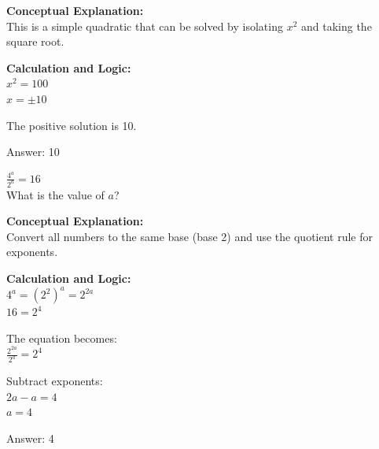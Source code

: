 \documentclass[11pt,paper=a4,answers]{exam}
\begin{document}
\begin{questions}
\begin{solution}
\textbf{Conceptual Explanation:} \\
This is a simple quadratic that can be solved by isolating $x^2$ and taking the square root.

\vspace{20pt}

\textbf{Calculation and Logic:} \\
$x^2 = 100$ \\
$x = \pm 10$

\vspace{10pt}

The positive solution is 10.

\vspace{25pt}

Answer: \colorbox{yellow!100}{10}
\end{solution}

\vspace{40pt}

\question
$\frac{4^a}{2^a} = 16$ \\
What is the value of $a$?

\begin{solution}
\textbf{Conceptual Explanation:} \\
Convert all numbers to the same base (base 2) and use the quotient rule for exponents.

\vspace{20pt}

\textbf{Calculation and Logic:} \\
$4^a = (2^2)^a = 2^{2a}$ \\
$16 = 2^4$

\vspace{10pt}

The equation becomes: \\
$\frac{2^{2a}}{2^a} = 2^4$

\vspace{10pt}

Subtract exponents: \\
$2a - a = 4$ \\
$a = 4$

\vspace{25pt}

Answer: \colorbox{yellow!100}{4}
\end{solution}

\vspace{40pt}


\end{questions}
\end{document}
